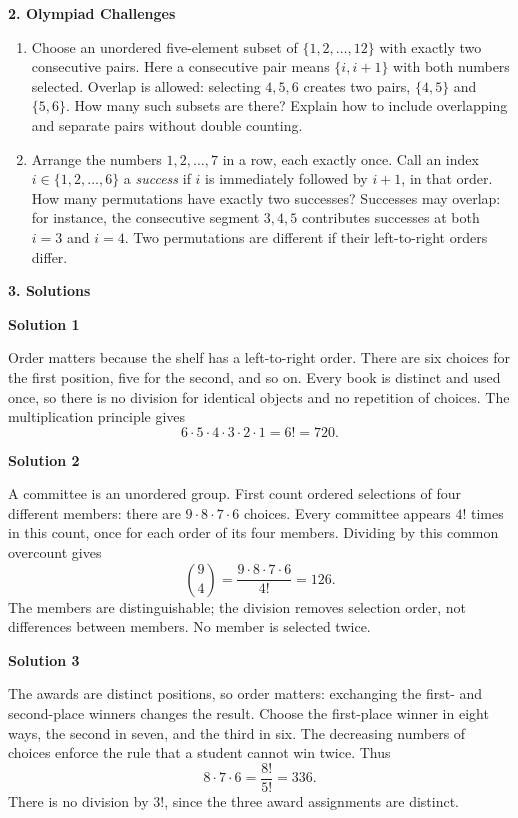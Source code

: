 \documentclass[11pt]{article}
\newcommand{\stageheading}[1]{%
  \par\Needspace{6\baselineskip}%
  \addvspace{.65\baselineskip}%
  {\centering\large\bfseries #1\par}%
  \nopagebreak[4]}
\newcommand{\solution}[1]{%
  \par\Needspace{5\baselineskip}\addvspace{.8\baselineskip}%
  {\large\bfseries Solution #1\par}\nopagebreak[4]}
\begin{document}
\stageheading{2. Olympiad Challenges}
\begin{enumerate}[label=\textbf{\arabic*.},start=9]
\item Choose an unordered five-element subset of $\{1,2,\ldots,12\}$
with exactly two consecutive pairs. Here a consecutive pair means
$\{i,i+1\}$ with both numbers selected. Overlap is allowed: selecting
$4,5,6$ creates two pairs, $\{4,5\}$ and $\{5,6\}$.
How many such subsets are there? Explain how to include overlapping
and separate pairs without double counting.

\item Arrange the numbers $1,2,\ldots,7$ in a row, each exactly once.
Call an index $i\in\{1,2,\ldots,6\}$ a \emph{success} if $i$ is
immediately followed by $i+1$, in that order. How many permutations
have exactly two successes? Successes may overlap: for instance,
the consecutive segment $3,4,5$ contributes successes at both $i=3$
and $i=4$. Two permutations are different if their left-to-right orders differ.
\end{enumerate}

\clearpage
\stageheading{3. Solutions}

\solution{1}
Order matters because the shelf has a left-to-right order. There are six
choices for the first position, five for the second, and so on. Every
book is distinct and used once, so there is no division for identical
objects and no repetition of choices. The multiplication principle gives
\[
6\cdot5\cdot4\cdot3\cdot2\cdot1=6!=\boxed{720}.
\]



\solution{2}
A committee is an unordered group. First count ordered selections of
four different members: there are $9\cdot8\cdot7\cdot6$ choices.
Every committee appears $4!$ times in this count, once for each order of
its four members. Dividing by this common overcount gives
\[
\binom94=\frac{9\cdot8\cdot7\cdot6}{4!}=\boxed{126}.
\]
The members are distinguishable; the division removes selection order,
not differences between members. No member is selected twice.



\solution{3}
The awards are distinct positions, so order matters: exchanging the first-
and second-place winners changes the result. Choose the first-place
winner in eight ways, the second in seven, and the third in six.
The decreasing numbers of choices enforce the rule that a student cannot
win twice. Thus
\[
8\cdot7\cdot6=\frac{8!}{5!}=\boxed{336}.
\]
There is no division by $3!$, since the three award assignments are distinct.
\end{document}
